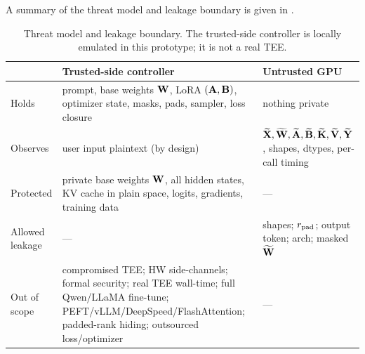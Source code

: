 A summary of the threat model and leakage boundary is given in .

\begin{table}[h]
\centering
\small
\caption{Threat model and leakage boundary. The trusted-side controller is locally emulated in this prototype; it is not a real TEE.}
\label{tab:threat-model}
\begin{tabularx}{\linewidth}{lXX}
\toprule
& \textbf{Trusted-side controller} & \textbf{Untrusted GPU} \\
\midrule
Holds & prompt, base weights $\mathbf{W}$, LoRA $(\mathbf{A},\mathbf{B})$, optimizer state, masks, pads, sampler, loss closure & nothing private \\
Observes & user input plaintext (by design) & $\widetilde{\mathbf{X}}, \widetilde{\mathbf{W}}, \widetilde{\mathbf{A}}, \widetilde{\mathbf{B}}, \widetilde{\mathbf{K}}, \widetilde{\mathbf{V}}, \widetilde{\mathbf{Y}}$, shapes, dtypes, per-call timing \\
Protected & private base weights $\mathbf{W}$, all hidden states, KV cache in plain space, logits, gradients, training data & --- \\
Allowed leakage & --- & shapes; $r_{\mathrm{pad}}$; output token; arch; masked $\widetilde{\mathbf{W}}$ \\
Out of scope & compromised TEE; HW side-channels; formal security; real TEE wall-time; full Qwen/LLaMA fine-tune; PEFT/vLLM/DeepSpeed/FlashAttention; padded-rank hiding; outsourced loss/optimizer & --- \\
\bottomrule
\end{tabularx}
\end{table}

